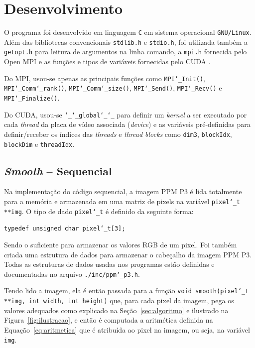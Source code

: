 \newpage
\section{Desenvolvimento \label{sec:desenvolvimento}}

O programa foi desenvolvido em linguagem \texttt{C} em sistema operacional \texttt{GNU/Linux}. Além das bibliotecas convencionais \texttt{stdlib.h} e \texttt{stdio.h}, foi utilizada também a \texttt{getopt.h} para leitura de argumentos na linha comando, a \texttt{mpi.h} fornecida pelo Open MPI \cite{bib:open-mpi} e as funções e tipos de variáveis fornecidas pelo CUDA \cite{bib:cuda}.

Do MPI, usou-se apenas as principais funções como \texttt{MPI\char`_Init()},\\ 
\texttt{MPI\char`_Comm\char`_rank()}, \texttt{MPI\char`_Comm\char`_size()}, \texttt{MPI\char`_Send()}, \texttt{MPI\char`_Recv()} e \texttt{MPI\char`_Finalize()}.

Do CUDA, usou-se \texttt{\char`_\char`_global\char`_\char`_} para definir um \textit{kernel} a ser executado por cada \textit{thread} da placa de vídeo associada (\textit{device}) e as variáveis pré-definidas para definir/receber os índices das \textit{threads} e \textit{thread blocks} como \texttt{dim3}, \texttt{blockIdx}, \texttt{blockDim} e \texttt{threadIdx}.

\subsection{\textit{Smooth} -- Sequencial}

Na implementação do código sequencial, a imagem PPM P3 é lida totalmente para a memória e armazenada em uma matriz de pixels na variável \texttt{pixel\char`_t **img}. O tipo de dado \texttt{pixel\char`_t} é definido da seguinte forma: 

\texttt{typedef unsigned char pixel\char`_t[3];}

Sendo o suficiente para armazenar os valores RGB de um pixel. Foi também criada uma estrutura de dados para armazenar o cabeçalho da imagem PPM P3. Todas as estruturas de dados usadas nos programas estão definidas e documentadas no arquivo \texttt{./inc/ppm\char`_p3.h}.

Tendo lido a imagem, ela é então passada para a função \texttt{void smooth(pixel\char`_t **img, int width, int height)} que, para cada pixel da imagem, pega os valores adequados como explicado na Seção~\ref{sec:algoritmo} e ilustrado na Figura~\ref{fig:ilustracao}, e então é computada a aritmética definida na Equação~\ref{eq:aritmetica} que é atribuída ao pixel na imagem, ou seja, na variável \texttt{img}.\\

